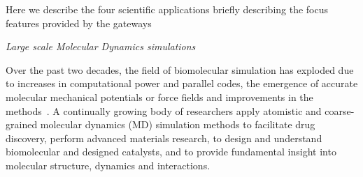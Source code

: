 \documentclass{sig-alternate}
\begin{document}
%
%
%
%
%
%
%


Here we describe the four scientific applications briefly describing the focus features provided by the gateways

\textit{Large scale Molecular Dynamics simulations}

Over the past two decades, the field of biomolecular simulation has
exploded due to increases in computational power and parallel codes,
the emergence of accurate molecular mechanical potentials or force
fields and improvements in the methods~\cite{amber,mackerell2008,adcock2006}. A continually growing body of researchers apply atomistic and coarse-grained molecular dynamics (MD) simulation
methods to facilitate drug discovery, perform advanced materials
research, to design and understand biomolecular and designed
catalysts, and to provide fundamental insight into molecular
structure, dynamics and interactions\cite{meinke2009,mcdowell2006,beck2007,}. 
\end{document}
